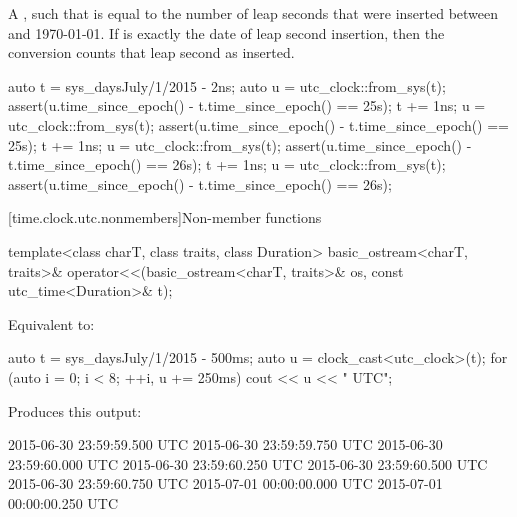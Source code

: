 \begin{itemdescr}
\pnum
\returns
A  , such that
is equal to the number of leap seconds that were inserted
between  and 1970-01-01.
If  is exactly the date of leap second insertion,
then the conversion counts that leap second as inserted.

\begin{example}
\begin{codeblock}
auto t = sys_days{July/1/2015} - 2ns;
auto u = utc_clock::from_sys(t);
assert(u.time_since_epoch() - t.time_since_epoch() == 25s);
t += 1ns;
u = utc_clock::from_sys(t);
assert(u.time_since_epoch() - t.time_since_epoch() == 25s);
t += 1ns;
u = utc_clock::from_sys(t);
assert(u.time_since_epoch() - t.time_since_epoch() == 26s);
t += 1ns;
u = utc_clock::from_sys(t);
assert(u.time_since_epoch() - t.time_since_epoch() == 26s);
\end{codeblock}
\end{example}
\end{itemdescr}

[time.clock.utc.nonmembers]{Non-member functions}

%
\begin{itemdecl}
template<class charT, class traits, class Duration>
  basic_ostream<charT, traits>&
    operator<<(basic_ostream<charT, traits>& os, const utc_time<Duration>& t);
\end{itemdecl}

\begin{itemdescr}
\pnum
\effects
Equivalent to:

\pnum
\begin{example}
\begin{codeblock}
auto t = sys_days{July/1/2015} - 500ms;
auto u = clock_cast<utc_clock>(t);
for (auto i = 0; i < 8; ++i, u += 250ms)
  cout << u << " UTC\n";
\end{codeblock}

Produces this output:

\begin{outputblock}
2015-06-30 23:59:59.500 UTC
2015-06-30 23:59:59.750 UTC
2015-06-30 23:59:60.000 UTC
2015-06-30 23:59:60.250 UTC
2015-06-30 23:59:60.500 UTC
2015-06-30 23:59:60.750 UTC
2015-07-01 00:00:00.000 UTC
2015-07-01 00:00:00.250 UTC
\end{outputblock}
\end{example}
\end{itemdescr}

